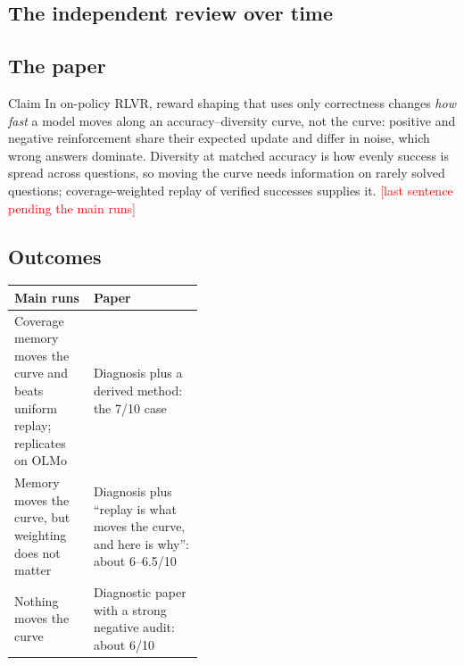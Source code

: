 \documentclass[11pt]{article}
\begin{document}
\subsection{The independent review over time}
\begin{center}\small
{}
\end{center}

\subsection{The paper}
\begin{idea}{Claim}
In on-policy RLVR, reward shaping that uses only correctness changes \emph{how fast} a model moves along an accuracy--diversity curve, not the curve: positive and negative reinforcement share their expected update and differ in noise, which wrong answers dominate. Diversity at matched accuracy is how evenly success is spread across questions, so moving the curve needs information on rarely solved questions; coverage-weighted replay of verified successes supplies it. \textcolor{red}{[last sentence pending the main runs]}
\end{idea}

\subsection{Outcomes}
\begin{center}\small
\begin{tabularx}{\linewidth}{@{}P{0.42\linewidth}Y@{}}
\toprule
Main runs & Paper\\
\midrule
Coverage memory moves the curve and beats uniform replay; replicates on OLMo & Diagnosis plus a derived method: the 7/10 case\\
Memory moves the curve, but weighting does not matter & Diagnosis plus ``replay is what moves the curve, and here is why'': about 6--6.5/10\\
Nothing moves the curve & Diagnostic paper with a strong negative audit: about 6/10\\
\bottomrule
\end{tabularx}
\end{center}
\end{document}
